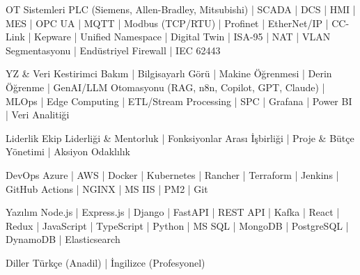 \vspace{-2mm}


\begin{cvskills}

  \cvskill
    {OT Sistemleri} %
    {PLC (Siemens, Allen-Bradley, Mitsubishi) | SCADA | DCS | HMI | MES | OPC UA | MQTT | Modbus (TCP/RTU) | Profinet | EtherNet/IP | CC-Link | Kepware | Unified Namespace | Digital Twin | ISA-95 | NAT | VLAN Segmentasyonu | Endüstriyel Firewall | IEC 62443} %

  \cvskill
    {YZ \& Veri} %
    {Kestirimci Bakım | Bilgisayarlı Görü | Makine Öğrenmesi | Derin Öğrenme | GenAI/LLM Otomasyonu (RAG, n8n, Copilot, GPT, Claude) | MLOps | Edge Computing | ETL/Stream Processing | SPC | Grafana | Power BI | Veri Analitiği} %

  \cvskill
    {Liderlik} %
    {Ekip Liderliği \& Mentorluk | Fonksiyonlar Arası İşbirliği | Proje \& Bütçe Yönetimi | Aksiyon Odaklılık} %

  \cvskill
    {DevOps} %
    {Azure | AWS | Docker | Kubernetes | Rancher | Terraform | Jenkins | GitHub Actions | NGINX | MS IIS | PM2 | Git} %

  \cvskill
    {Yazılım} %
    {Node.js | Express.js | Django | FastAPI | REST API | Kafka | React | Redux | JavaScript | TypeScript | Python | MS SQL | MongoDB | PostgreSQL | DynamoDB | Elasticsearch} %

  \cvskill
    {Diller} %
    {Türkçe (Anadil) | İngilizce (Profesyonel)} %

\end{cvskills}
